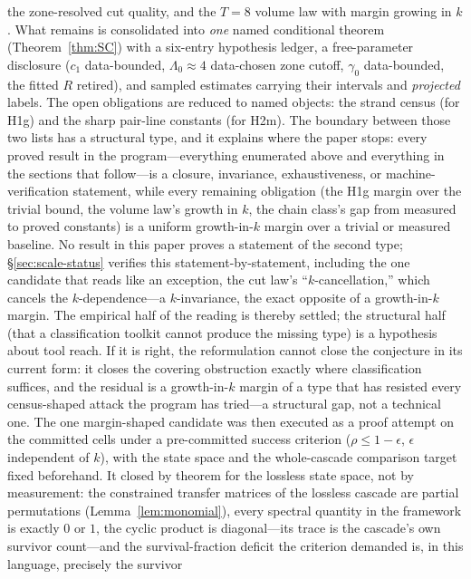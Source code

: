 \documentclass[11pt,a4paper]{article}
\numberwithin{equation}{section}
\theoremstyle{plain}
\theoremstyle{plain}
\theoremstyle{definition}
\theoremstyle{remark}
\begin{document}
\begin{enumerate}[leftmargin=1.6em,itemsep=2pt]
  the zone-resolved cut quality, and the $T=8$ volume law with margin
  growing in $k$. What remains is consolidated into \emph{one} named
  conditional theorem (Theorem~\ref{thm:SC}) with a six-entry hypothesis
  ledger, a free-parameter disclosure ($c_1$ data-bounded, $\Lambda_0\approx4$
  data-chosen zone cutoff, $\gamma_0$ data-bounded, the fitted $R$ retired), and
  sampled estimates carrying their intervals and \emph{projected} labels.
  The open obligations are reduced to named objects: the strand
  census (for H1g) and the sharp pair-line constants (for H2m).
  The boundary between those two lists has a structural type, and it
  explains where the paper stops: every proved result in the
  program---everything enumerated above and everything in the sections
  that follow---is a closure, invariance, exhaustiveness, or
  machine-verification statement, while every remaining obligation (the
  H1g margin over the trivial bound, the volume law's growth in $k$, the
  chain class's gap from measured to proved constants) is a uniform
  growth-in-$k$ margin over a trivial or measured baseline. No result in
  this paper proves a statement of the second type; \S\ref{sec:scale-status}
  verifies this statement-by-statement,
  including the one candidate that reads like an exception, the cut
  law's ``$k$-cancellation,'' which cancels the $k$-dependence---a
  $k$-invariance, the exact opposite of a growth-in-$k$ margin. The
  empirical half of the reading is thereby settled; the structural half
  (that a classification toolkit cannot produce the missing type) is a
  hypothesis about tool reach. If it is right, the reformulation cannot
  close the conjecture in its current form: it closes the covering
  obstruction exactly where classification suffices, and the residual is
  a growth-in-$k$ margin of a type that has resisted every census-shaped
  attack the program has tried---a structural gap, not a technical one.
  The one margin-shaped candidate was then executed as a proof attempt
  on the committed cells under a pre-committed success criterion
  ($\rho\le 1-\epsilon$, $\epsilon$ independent of $k$), with the state
  space and the whole-cascade comparison target fixed beforehand. It
  closed by theorem for the lossless state space, not by measurement:
  the constrained transfer
  matrices of the lossless cascade are partial permutations
(Lemma~\ref{lem:monomial}), every spectral quantity in the framework
is exactly $0$ or $1$, the cyclic product is diagonal---its trace is
the cascade's own survivor count---and the survival-fraction deficit
the criterion demanded is, in this language, precisely the survivor

\end{enumerate}
\end{document}
